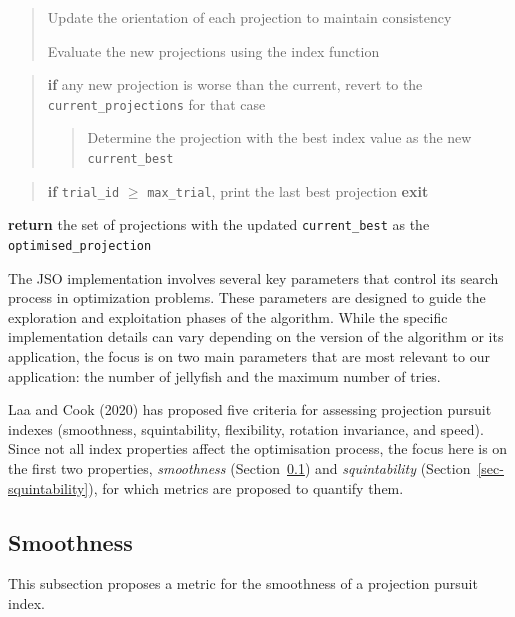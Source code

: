 \documentclass[
  12pt,
]{interact}
\theoremstyle{plain}
\begin{document}
\begin{tcolorbox}
\begin{quote}
Update the orientation of each projection to maintain consistency

Evaluate the new projections using the index function
\end{quote}

\begin{quote}
\textbf{if} any new projection is worse than the current, revert to the
\texttt{current\_projections} for that case

\begin{quote}
Determine the projection with the best index value as the new
\texttt{current\_best}
\end{quote}
\end{quote}

\begin{quote}
\textbf{if} \texttt{trial\_id} \(\ge\) \texttt{max\_trial}, print the
last best projection \textbf{exit}
\end{quote}

\textbf{return} the set of projections with the updated
\texttt{current\_best} as the \texttt{optimised\_projection}

\end{tcolorbox}

The JSO implementation involves several key parameters that control its
search process in optimization problems. These parameters are designed
to guide the exploration and exploitation phases of the algorithm. While
the specific implementation details can vary depending on the version of
the algorithm or its application, the focus is on two main parameters
that are most relevant to our application: the number of jellyfish and
the maximum number of tries.

Laa and Cook (2020) has proposed five criteria for assessing projection
pursuit indexes (smoothness, squintability, flexibility, rotation
invariance, and speed). Since not all index properties affect the
optimisation process, the focus here is on the first two properties,
\emph{smoothness} (Section~\ref{sec-smoothness}) and
\emph{squintability} (Section~\ref{sec-squintability}), for which
metrics are proposed to quantify them.

\subsection{Smoothness}\label{sec-smoothness}

This subsection proposes a metric for the smoothness of a projection
pursuit index.
\end{document}
